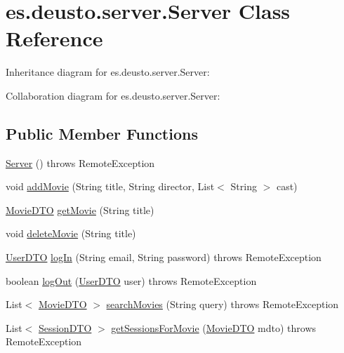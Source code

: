\hypertarget{classes_1_1deusto_1_1server_1_1_server}{}\section{es.\+deusto.\+server.\+Server Class Reference}
\label{classes_1_1deusto_1_1server_1_1_server}


Inheritance diagram for es.\+deusto.\+server.\+Server\+:


Collaboration diagram for es.\+deusto.\+server.\+Server\+:
\subsection*{Public Member Functions}
\begin{DoxyCompactItemize}
\item 
\mbox{\hyperlink{classes_1_1deusto_1_1server_1_1_server_a84f78162a65dd737f224eb2f94c43023}{Server}} ()  throws Remote\+Exception 
\item 
void \mbox{\hyperlink{classes_1_1deusto_1_1server_1_1_server_a150317903dc393d29f39db81e79131e0}{add\+Movie}} (String title, String director, List$<$ String $>$ cast)
\item 
\mbox{\hyperlink{classes_1_1deusto_1_1server_1_1data_1_1_movie_d_t_o}{Movie\+D\+TO}} \mbox{\hyperlink{classes_1_1deusto_1_1server_1_1_server_a7e4544c63bcf2b2d3abce0d2ff1567ac}{get\+Movie}} (String title)
\item 
void \mbox{\hyperlink{classes_1_1deusto_1_1server_1_1_server_a6501e4103fcc2ef691c15e4e02f7136c}{delete\+Movie}} (String title)
\item 
\mbox{\hyperlink{classes_1_1deusto_1_1server_1_1data_1_1_user_d_t_o}{User\+D\+TO}} \mbox{\hyperlink{classes_1_1deusto_1_1server_1_1_server_ab93f5cc9b5825192c31cd2088014378d}{log\+In}} (String email, String password)  throws Remote\+Exception 
\item 
boolean \mbox{\hyperlink{classes_1_1deusto_1_1server_1_1_server_a92cf8a599adfa6a34f7cfe788119cf0a}{log\+Out}} (\mbox{\hyperlink{classes_1_1deusto_1_1server_1_1data_1_1_user_d_t_o}{User\+D\+TO}} user)  throws Remote\+Exception 
\item 
List$<$ \mbox{\hyperlink{classes_1_1deusto_1_1server_1_1data_1_1_movie_d_t_o}{Movie\+D\+TO}} $>$ \mbox{\hyperlink{classes_1_1deusto_1_1server_1_1_server_a16789cc76edd46978ffbb58581caf5db}{search\+Movies}} (String query)  throws Remote\+Exception 
\item 
List$<$ \mbox{\hyperlink{classes_1_1deusto_1_1server_1_1data_1_1_session_d_t_o}{Session\+D\+TO}} $>$ \mbox{\hyperlink{classes_1_1deusto_1_1server_1_1_server_a33a6671bb4dc4bd9e23df10e53e5632d}{get\+Sessions\+For\+Movie}} (\mbox{\hyperlink{classes_1_1deusto_1_1server_1_1data_1_1_movie_d_t_o}{Movie\+D\+TO}} mdto)  throws Remote\+Exception 

\end{DoxyCompactItemize}
